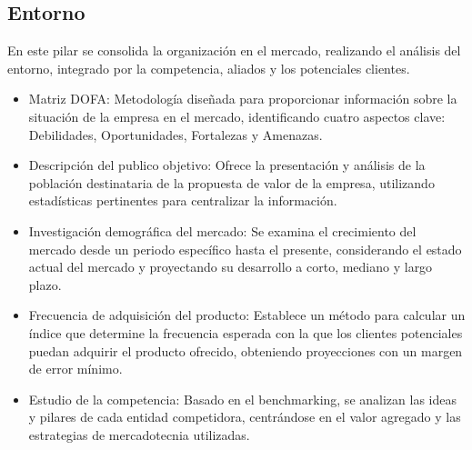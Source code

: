 

{\color{blue}\subsection{Entorno}


En este pilar se consolida la organización en el mercado, realizando el análisis del entorno, integrado por la competencia, aliados y los potenciales clientes.

\begin{itemize}
    \item Matriz DOFA: Metodología diseñada para proporcionar información sobre la situación de la empresa en el mercado, identificando cuatro aspectos clave: Debilidades, Oportunidades, Fortalezas y Amenazas.
    \item Descripción del publico objetivo: Ofrece la presentación y análisis de la población destinataria de la propuesta de valor de la empresa, utilizando estadísticas pertinentes para centralizar la información.
    \item Investigación demográfica del mercado: Se examina el crecimiento del mercado desde un periodo específico hasta el presente, considerando el estado actual del mercado y proyectando su desarrollo a corto, mediano y largo plazo.
    \item Frecuencia de adquisición del producto: Establece un método para calcular un índice que determine la frecuencia esperada con la que los clientes potenciales puedan adquirir el producto ofrecido, obteniendo proyecciones con un margen de error mínimo.
    \item Estudio de la competencia: Basado en el benchmarking, se analizan las ideas y pilares de cada entidad competidora, centrándose en el valor agregado y las estrategias de mercadotecnia utilizadas.
\end{itemize}
}